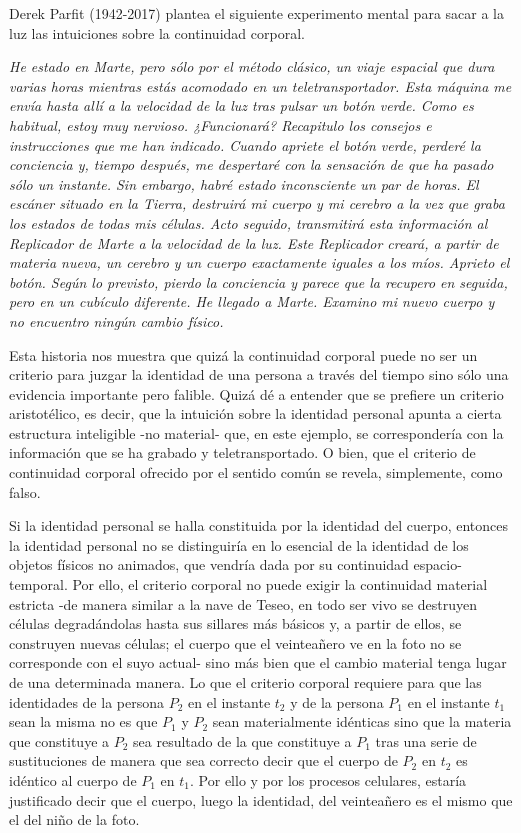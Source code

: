 \documentclass[main.tex]{subfiles}
\begin{document}
Derek Parfit (1942-2017) plantea el siguiente experimento mental para sacar a la luz las intuiciones sobre la continuidad corporal.

\textit{He estado en Marte, pero sólo por el método clásico, un viaje espacial que dura varias horas mientras estás acomodado en un teletransportador. Esta máquina me envía hasta allí a la velocidad de la luz tras pulsar un botón verde. Como es habitual, estoy muy nervioso. ¿Funcionará? Recapitulo los consejos e instrucciones que me han indicado. Cuando apriete el botón verde, perderé la conciencia y, tiempo después, me despertaré con la sensación de que ha pasado sólo un instante. Sin embargo, habré estado inconsciente un par de horas. El escáner situado en la Tierra, destruirá mi cuerpo y mi cerebro a la vez que graba los estados de todas mis células. Acto seguido, transmitirá esta información al Replicador de Marte a la velocidad de la luz. Este Replicador creará, a partir de materia nueva, un cerebro y un cuerpo exactamente iguales a los míos. Aprieto el botón. Según lo previsto, pierdo la conciencia y parece que la recupero en seguida, pero en un cubículo diferente. He llegado a Marte. Examino mi nuevo cuerpo y no encuentro ningún cambio físico.}

Esta historia nos muestra que quizá la continuidad corporal puede no ser un criterio para juzgar la identidad de una persona a través del tiempo sino sólo una evidencia importante pero falible. Quizá dé a entender que se prefiere un criterio aristotélico, es decir, que la intuición sobre la identidad personal apunta a cierta estructura inteligible -no material- que, en este ejemplo, se correspondería con la información que se ha grabado y teletransportado. O bien, que el criterio de continuidad corporal ofrecido por el sentido común se revela, simplemente, como falso.


Si la identidad personal se halla constituida por la identidad del cuerpo, entonces la identidad personal no se distinguiría en lo esencial de la identidad de los objetos físicos no animados, que vendría dada por su continuidad espacio-temporal. Por ello, el criterio corporal no puede exigir la continuidad material estricta -de manera similar a la nave de Teseo, en todo ser vivo se destruyen células degradándolas hasta sus sillares más básicos y, a partir de ellos, se construyen nuevas células; el cuerpo que el veinteañero ve en la foto no se corresponde con el suyo actual- sino más bien que el cambio material tenga lugar de una determinada manera. Lo que el criterio corporal requiere para que las identidades de la persona $P_{2}$ en el instante $t_{2}$ y de la persona $P_{1}$ en el instante $t_{1}$ sean la misma no es que $P_{1}$ y $P_{2}$ sean materialmente idénticas sino que la materia que constituye a $P_{2}$ sea resultado de la que constituye a $P_{1}$ tras una serie de sustituciones de manera que sea correcto decir que el cuerpo de $P_{2}$ en $t_{2}$ es idéntico al cuerpo de $P_{1}$ en $t_{1}$. Por ello y por los procesos celulares, estaría justificado decir que el cuerpo, luego la identidad, del veinteañero es el mismo que el del niño de la foto.
\end{document}
